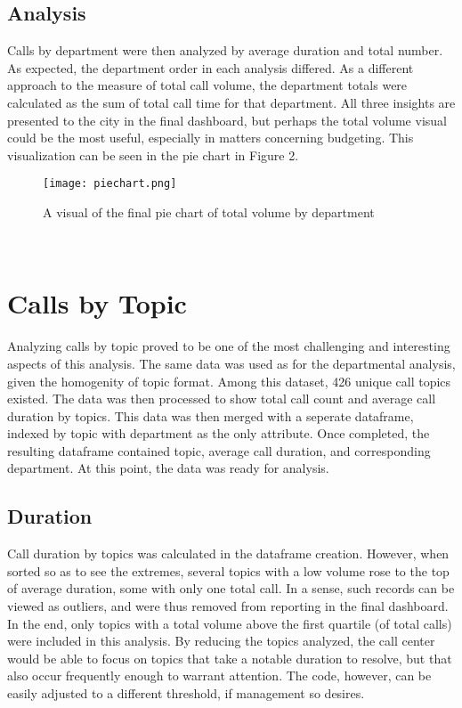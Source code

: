 \documentclass[11pt,twocolumn]{article}
\begin{document}
\subsection{Analysis}
Calls by department were then analyzed by average duration and total number.  As expected, the department order in each analysis differed.  As a different approach to the measure of total call volume, the department totals were calculated as the sum of total call time for that department.  All three insights are presented to the city in the final dashboard, but perhaps the total volume visual could be the most useful, especially in matters concerning budgeting.  This visualization can be seen in the pie chart in Figure 2.
\begin{figure}[h]
  \texttt{[image: piechart.png]}
  \caption{A visual of the final pie chart of total volume by department}
 \end{figure}
\\
 
\section{Calls by Topic}
Analyzing calls by topic proved to be one of the most challenging and interesting aspects of this analysis.  The same data was used as for the departmental analysis, given the homogenity of topic format.  Among this dataset, 426 unique call topics existed.  The data was then processed to show total call count and average call duration by topics.  This data was then merged with a seperate dataframe, indexed by topic with department as the only attribute.  Once completed, the resulting dataframe contained topic, average call duration, and corresponding department.  At this point, the data was ready for analysis.

\subsection{Duration}
Call duration by topics was calculated in the dataframe creation.  However, when sorted so as to see the extremes, several topics with a low volume rose to the top of average duration, some with only one total call.  In a sense, such records can be viewed as outliers, and were thus removed from reporting in the final dashboard.  In the end, only topics with a total volume above the first quartile (of total calls) were included in this analysis.  By reducing the topics analyzed, the call center would be able to focus on topics that take a notable duration to resolve, but that also occur frequently enough to warrant attention.  The code, however, can be easily adjusted to a different threshold, if management so desires.
\end{document}
